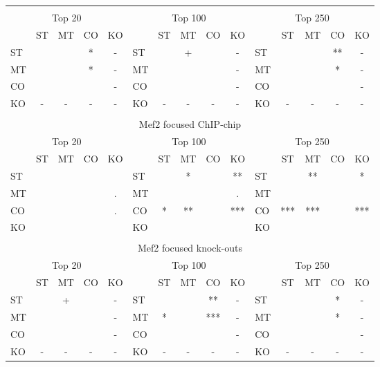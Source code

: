 \documentclass{article}
\begin{document}
\begin{longtable}[c]{lcccc|lcccc|lcccc}
\hline
\newpage
\multicolumn{15}{c}{Mef2 global knock-outs} \\
\multicolumn{5}{c|}{Top 20} &\multicolumn{5}{c|}{Top 100}  & \multicolumn{5}{c}{Top 250}\\
    & ST  & MT  & CO  & KO &     & ST  & MT  & CO  & KO  &     & ST  & MT  & CO  & KO \\
ST &     &     & *   & -   & ST &     & +   &     & -   & ST &     &     & **  & -  \\
MT &     &     & *   & -   & MT &     &     &     & -   & MT &     &     & *   & -  \\
CO &     &     &     & -   & CO &     &     &     & -   & CO &     &     &     & -  \\
KO & -   & -   & -   & -   & KO & -   & -   & -   & -   & KO & -   & -   & -   & -  \\
\hline
\\[0mm]
\multicolumn{15}{c}{Mef2 focused ChIP-chip} \\
\multicolumn{5}{c|}{Top 20} &\multicolumn{5}{c|}{Top 100}  & \multicolumn{5}{c}{Top 250}\\
    & ST  & MT  & CO  & KO &     & ST  & MT  & CO  & KO  &     & ST  & MT  & CO  & KO \\
ST &     &     &     &     & ST &     & *   &     & **  & ST &     & **  &     & *  \\
MT &     &     &     & .   & MT &     &     &     & .   & MT &     &     &     &    \\
CO &     &     &     & .   & CO & *   & **  &     & *** & CO & *** & *** &     & ***\\
KO &     &     &     &     & KO &     &     &     &     & KO &     &     &     &    \\[3mm]
\hline
\\[0mm]
\multicolumn{15}{c}{Mef2 focused knock-outs} \\
\multicolumn{5}{c|}{Top 20} &\multicolumn{5}{c|}{Top 100}  & \multicolumn{5}{c}{Top 250}\\
    & ST  & MT  & CO  & KO &     & ST  & MT  & CO  & KO  &     & ST  & MT  & CO  & KO \\
ST &     & +   &     & -   & ST &     &     & **  & -   & ST &     &     & *   & -  \\
MT &     &     &     & -   & MT & *   &     & *** & -   & MT &     &     & *   & -  \\
CO &     &     &     & -   & CO &     &     &     & -   & CO &     &     &     & -  \\
KO & -   & -   & -   & -   & KO & -   & -   & -   & -   & KO & -   & -   & -   & -  \\
\end{longtable}
\end{document}
